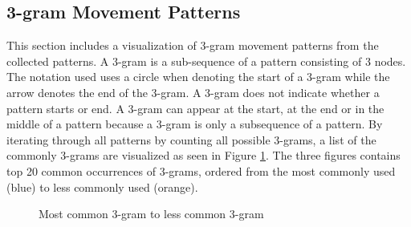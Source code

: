   \clearpage

  \subsection{3-gram Movement Patterns} \label{sec:3gram}
    This section includes a visualization of 3-gram movement patterns from the collected patterns. A 3-gram is a sub-sequence of a pattern consisting of 3 nodes. The notation used uses a circle when denoting the start of a 3-gram while the arrow denotes the end of the 3-gram. A 3-gram does not indicate whether a pattern starts or end.  A 3-gram can appear at the start, at the end or in the middle of a pattern because a 3-gram is only a subsequence of a pattern.  By iterating through all patterns by counting all possible 3-grams, a list of the commonly 3-grams are visualized as seen in Figure \ref{fig:3gram}. The three figures contains top 20 common occurrences of 3-grams, ordered from the most commonly used (blue) to less commonly used (orange). 

    \begin{figure}[H]
      \caption{Most common 3-gram to less common 3-gram}
      \label{fig:3gram}
    \end{figure}

